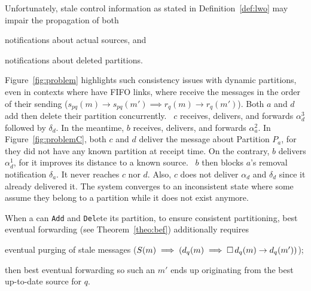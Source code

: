 Unfortunately, stale control information as stated in
Definition~\ref{def:lwo} may impair the propagation of both
\begin{inparaenum}[(i)]
\item notifications about actual sources, and
\item notifications about deleted partitions.
\end{inparaenum}
Figure~\ref{fig:problem} highlights such consistency issues with
dynamic partitions, even in contexts where \processes have FIFO links,
\ie where \processes receive the messages in the order of their
sending ($s_{pq}(m) \rightarrow s_{pq}(m') \implies r_q(m) \rightarrow
r_q(m')$). Both $a$ and $d$ add then delete their partition
concurrently. \Process~$c$ receives, delivers, and forwards
$\alpha_d^3$ followed by $\delta_d$. In the meantime, $b$ receives,
delivers, and forwards $\alpha_a^2$. In Figure~\ref{fig:problemC},
both $c$ and $d$ deliver the message about Partition $P_a$, for they
did not have any known partition at receipt time. On the contrary, $b$
delivers $\alpha_d^1$, for it improves its distance to a known
source. \Process~$b$ then blocks $a$'s removal notification
$\delta_a$. It never reaches $c$ nor $d$. Also, $c$ does not deliver
$\alpha_d$ and $\delta_d$ since it already delivered it. The system
converges to an inconsistent state where some \processes assume they
belong to a partition while it does not exist anymore.



\begin{theorem}
%
When a \process can \texttt{Add} and \texttt{Del}ete its partition, to
ensure consistent partitioning, best eventual forwarding (see
Theorem~\ref{theo:bef}) additionally requires
\begin{inparaenum}[(i)]
\item eventual purging of stale messages ($S(m)
  \implies (d_q(m) \implies \square\, d_q(m) \rightarrow
  d_q(m'))$);
\item then best eventual forwarding so such an $m'$ ends up
  originating from the best up-to-date source for $q$.
\end{inparaenum}
\end{theorem}

